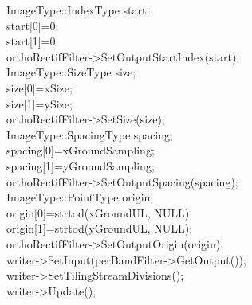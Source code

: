 \begin{scriptsize}
\indent ImageType::IndexType start;\\
\indent start[0]=0;\\
\indent start[1]=0;\\
\indent orthoRectifFilter->SetOutputStartIndex(start);\\
\indent ImageType::SizeType size;\\
\indent size[0]=xSize;\\
\indent size[1]=ySize;\\
\indent orthoRectifFilter->SetSize(size);\\
\indent ImageType::SpacingType spacing;\\
\indent spacing[0]=xGroundSampling;\\
\indent spacing[1]=yGroundSampling;\\
\indent orthoRectifFilter->SetOutputSpacing(spacing);\\
\indent ImageType::PointType origin;\\
\indent origin[0]=strtod(xGroundUL, NULL);\\
\indent origin[1]=strtod(yGroundUL, NULL);\\
\indent orthoRectifFilter->SetOutputOrigin(origin);\\

\indent writer->SetInput(perBandFilter->GetOutput());\\ 	
\indent writer->SetTilingStreamDivisions();\\
\indent writer->Update();\\
\end{scriptsize}

